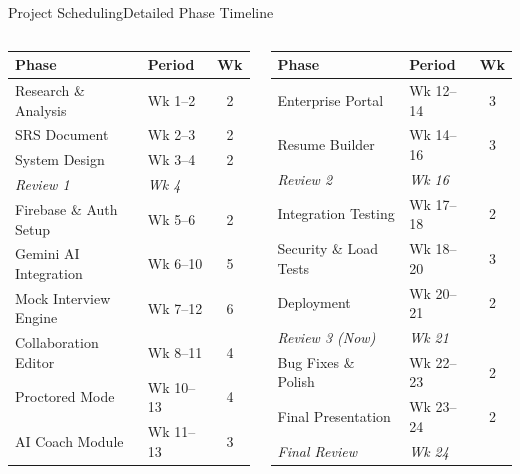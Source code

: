 \documentclass{beamer}
\begin{document}
\begin{frame}{Project Scheduling}{Detailed Phase Timeline}
\tiny
\begin{columns}[t]
\begin{table}
\centering
\tiny
\begin{tabular}{|p{2.5cm}|p{1.5cm}|c|}
\hline
\textbf{Phase} & \textbf{Period} & \textbf{Wk} \\ \hline
Research \& Analysis & Wk 1--2 & 2 \\ \hline
SRS Document & Wk 2--3 & 2 \\ \hline
System Design & Wk 3--4 & 2 \\ \hline
\textit{Review 1} & \textit{Wk 4} & \\ \hline
Firebase \& Auth Setup & Wk 5--6 & 2 \\ \hline
Gemini AI Integration & Wk 6--10 & 5 \\ \hline
Mock Interview Engine & Wk 7--12 & 6 \\ \hline
Collaboration Editor & Wk 8--11 & 4 \\ \hline
Proctored Mode & Wk 10--13 & 4 \\ \hline
AI Coach Module & Wk 11--13 & 3 \\ \hline
\end{tabular}
\end{table}
\begin{table}
\centering
\tiny
\begin{tabular}{|p{2.5cm}|p{1.5cm}|c|}
\hline
\textbf{Phase} & \textbf{Period} & \textbf{Wk} \\ \hline
Enterprise Portal & Wk 12--14 & 3 \\ \hline
Resume Builder & Wk 14--16 & 3 \\ \hline
\textit{Review 2} & \textit{Wk 16} & \\ \hline
Integration Testing & Wk 17--18 & 2 \\ \hline
Security \& Load Tests & Wk 18--20 & 3 \\ \hline
Deployment & Wk 20--21 & 2 \\ \hline
\textit{Review 3 (Now)} & \textit{Wk 21} & \\ \hline
Bug Fixes \& Polish & Wk 22--23 & 2 \\ \hline
Final Presentation & Wk 23--24 & 2 \\ \hline
\textit{Final Review} & \textit{Wk 24} & \\ \hline
\end{tabular}
\end{table}
\end{columns}
\end{frame}
\end{document}
